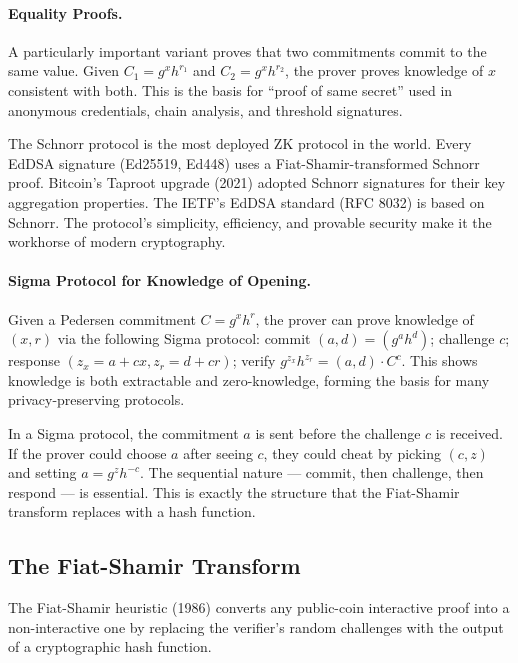 \paragraph{Equality Proofs.} A particularly important variant proves that two commitments commit to the same value. Given $C_1 = g^{x} h^{r_1}$ and $C_2 = g^{x} h^{r_2}$, the prover proves knowledge of $x$ consistent with both. This is the basis for ``proof of same secret'' used in anonymous credentials, chain analysis, and threshold signatures.

The Schnorr protocol is the most deployed ZK protocol in the world. Every EdDSA signature (Ed25519, Ed448) uses a Fiat-Shamir-transformed Schnorr proof. Bitcoin's Taproot upgrade (2021) adopted Schnorr signatures for their key aggregation properties. The IETF's EdDSA standard (RFC 8032) is based on Schnorr. The protocol's simplicity, efficiency, and provable security make it the workhorse of modern cryptography.

\paragraph{Sigma Protocol for Knowledge of Opening.} Given a Pedersen commitment $C = g^x h^r$, the prover can prove knowledge of $(x,r)$ via the following Sigma protocol: commit $(a,d) = (g^a h^d)$; challenge $c$; response $(z_x = a + c x, z_r = d + c r)$; verify $g^{z_x} h^{z_r} = (a,d) \cdot C^c$. This shows knowledge is both extractable and zero-knowledge, forming the basis for many privacy-preserving protocols.

In a Sigma protocol, the commitment $a$ is sent before the challenge $c$ is received. If the prover could choose $a$ after seeing $c$, they could cheat by picking $(c,z)$ and setting $a = g^z h^{-c}$. The sequential nature --- commit, then challenge, then respond --- is essential. This is exactly the structure that the Fiat-Shamir transform replaces with a hash function.

\subsection{The Fiat-Shamir Transform}
\label{sec:zk:fiatshamir}

The Fiat-Shamir heuristic (1986) converts any public-coin interactive proof into a non-interactive one by replacing the verifier's random challenges with the output of a cryptographic hash function.


